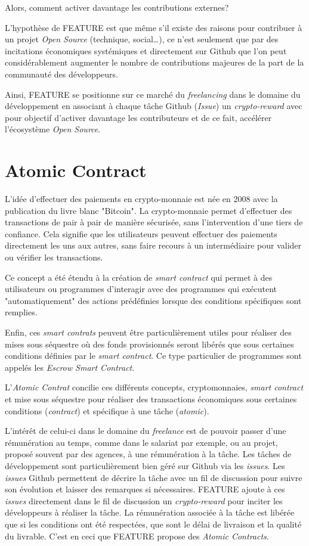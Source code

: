 \documentclass[
	a4paper, %
	10pt, %
	unnumberedsections, %
	twoside, %
]{LTJournalArticle}
\begin{document}
Alors, comment activer davantage les contributions externes?

L'hypothèse de FEATURE est que même s'il existe des raisons pour contribuer à un projet \emph{Open Source} (technique, social\ldots), ce n'est seulement que par des incitations économiques systémiques et directement sur Github que l'on peut considérablement augmenter le nombre de contributions majeures de la part de la communauté des développeurs.

Ainsi, FEATURE se positionne sur ce marché du \emph{freelancing} dans le domaine du développement en associant à chaque tâche Github (\emph{Issue}) un \emph{crypto-reward} avec pour objectif d'activer davantage les contributeurs et de ce fait, accélérer l'écosystème \emph{Open Source}.


\section{Atomic Contract}

L'idée d'effectuer des paiements en crypto-monnaie est née en 2008 avec la publication du livre blanc "Bitcoin". La crypto-monnaie permet d'effectuer des transactions de pair à pair de manière sécurisée, sans l'intervention d'une tiers de confiance. Cela signifie que les utilisateurs peuvent effectuer des paiements directement les uns aux autres, sans faire recours à un intermédiaire pour valider ou vérifier les transactions.

Ce concept a été étendu à la création de \emph{smart contract} qui permet à des utilisateurs ou programmes d'interagir avec des programmes qui exécutent "automatiquement" des actions prédéfinies lorsque des conditions spécifiques sont remplies.

Enfin, ces \emph{smart contrats} peuvent être particulièrement utiles pour réaliser des mises sous séquestre où des fonds provisionnés seront libérés que sous certaines conditions définies par le \emph{smart contract}. Ce type particulier de programmes sont appelés les \emph{Escrow Smart Contract}.

L'\emph{Atomic Contrat} concilie ces différents concepts, cryptomonnaies, \emph{smart contract} et mise sous séquestre pour réaliser des transactions économiques sous certaines conditions (\emph{contract}) et spécifique à une tâche (\emph{atomic}).

L'intérêt de celui-ci dans le domaine du \emph{freelance} est de pouvoir passer d'une rémunération au temps, comme dans le salariat par exemple, ou au projet, proposé souvent par des agences, à une rémunération à la tâche. Les tâches de développement sont particulièrement bien géré sur Github via les \emph{issues}. Les \emph{issues} Github permettent de décrire la tâche avec un fil de discussion pour suivre son évolution et laisser des remarques si nécessaires. FEATURE ajoute à ces \emph{issues} directement dans le fil de discussion un \emph{crypto-reward} pour inciter les développeurs à réaliser la tâche. La rémunération associée à la tâche est libérée que si les conditions ont été respectées, que sont le délai de livraison et la qualité du livrable. C'est en ceci que FEATURE propose des \emph{Atomic Contracts}.
\end{document}
